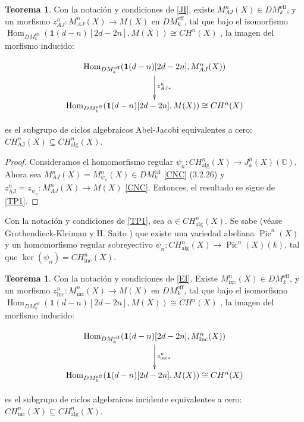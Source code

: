 \documentclass[10pt]{amsart}
\theoremstyle{definition}
\newtheorem{theorem}[definition]{Teorema}
\theoremstyle{remark}
\theoremstyle{definition}
\begin{document}
\begin{theorem}
Con la notación y condiciones de \ref{JI}, existe $M_{AJ}^{n}(X)\in DM_{k}^{\mathrm{eff}}$, y un morfismo $z_{AJ}^{n}:M_{AJ}^{n}(X)\to M(X)$ en $DM_{k}^{\mathrm{eff}}$, tal que bajo el isomorfismo $\operatorname{Hom}_{DM_{k}^{\mathrm{eff}}}(\mathbf{1}(d-n)[2d-2n],M(X)) \cong CH^{n}(X)$ \cite[Prop. 2.1.4, Thm. 3.2.6]{Voe00b}, la imagen del morfismo inducido:

$$\xymatrix@R=10mm{ 
\operatorname{Hom}_{DM_{k}^{\mathrm{eff}}}(\mathbf{1}(d-n)[2d-2n],M_{AJ}^{n}(X)) 
\ar@{->}[d]^{z_{AJ*}^{n}}\\
\operatorname{Hom}_{DM_{k}^{\mathrm{eff}}}(\mathbf{1}(d-n)[2d-2n],M(X))\cong CH^{n}(X)
}$$

es el subgrupo de ciclos algebraicos Abel-Jacobi equivalentes a cero: $CH_{\mathrm{AJ}}^{n}(X)\subseteq CH_{\mathrm{alg}}^{n}(X)$.
\end{theorem}

\begin{proof}
Consideramos el homomorfismo regular $\psi_{n}:CH_{\mathrm{alg}}^{n}(X)\to J_{a}^{n}(X)(\mathbb{C})$. Ahora sea $M_{AJ}^{n}(X)=M_{\psi_{n}}^{n}(X)\in DM_{k}^{\mathrm{eff}}$ \ref{CNC} (3.2.26) y $z_{\mathrm{\mathrm{AJ}}}^{n}=z_{\psi_{n}}:M_{AJ}^{n}(X)\to M(X)$ \ref{CNC}. Entonces, el resultado se sigue de \ref{TP1}.
\end{proof}

Con la notación y condiciones de \ref{TP1}, sea $\alpha\in CH_{\mathrm{alg}}^{n}(X)$. Se sabe (véase Grothendieck-Kleiman \cite[p. 446-447]{Kle71} y H. Saito \cite[Thm. 3.6]{Sai79}) que existe una variedad abeliana $\operatorname{Pic}^{n}(X)$ y un homomorfismo regular sobreyectivo $\psi_{n}:CH_{\mathrm{alg}}^{n}(X)\to \operatorname{Pic}^{n}(X)(k)$, tal que $\ker(\psi_{n})=CH_{\mathrm{inc}}^{n}(X)$.

\begin{theorem}
Con la notación y condiciones de \ref{EI}. Existe $M_{\mathrm{inc}}^{n}(X)\in DM_{k}^{\mathrm{eff}}$, y un morfismo $z_{\mathrm{inc}}^{n}:M_{\mathrm{inc}}^{n}(X)\to M(X)$ en $DM_{k}^{\mathrm{eff}}$, tal que bajo el isomorfismo $\operatorname{Hom}_{DM_{k}^{\mathrm{eff}}}(\mathbf{1}(d-n)[2d-2n],M(X)) \cong CH^{n}(X)$ \cite[Prop. 2.1.4, Thm. 3.2.6]{Voe00b}, la imagen del morfismo inducido:


$$\xymatrix@R=10mm{ 
\operatorname{Hom}_{DM_{k}^{\mathrm{eff}}}(\mathbf{1}(d-n)[2d-2n],M_{\mathrm{Inc}}^{n}(X)) 
\ar@{->}[d]^{z_{\mathrm{inc*}}^{n}}\\
\operatorname{Hom}_{DM_{k}^{\mathrm{eff}}}(\mathbf{1}(d-n)[2d-2n],M(X))\cong CH^{n}(X)
}$$



es el subgrupo de ciclos algebraicos incidente equivalentes a cero: $CH_{\mathrm{inc}}^{n}(X)\subseteq CH_{\mathrm{alg}}^{n}(X)$.
\end{theorem}
\end{document}
